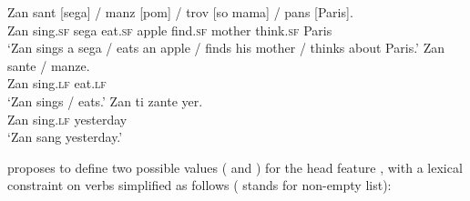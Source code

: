 \begin{exe}
\ex \begin{xlist}
\ex 
\gll Zan sant             [sega]         /  manz            [pom]           /  trov             [so mama] / pans [Paris]. \\
     Zan sing.\textsc{sf} \spacebr{}sega {} eat.\textsc{sf} \spacebr{}apple {} find.\textsc{sf} \spacebr{}\POSS{} mother {} think.\textsc{sf} \spacebr{}Paris \\
\glt `Zan sings a sega / eats an apple / finds his mother / thinks about Paris.'	
\ex 
\gll Zan sante / manze.\\
     Zan sing.\textsc{lf} {} eat.\textsc{lf}\\
\glt `Zan sings / eats.'
\ex 
\gll Zan ti zante yer. \\
Zan  \PRF{} sing.\textsc{lf} yesterday\\
\glt `Zan sang yesterday.'
\end{xlist}
\end{exe}


\citet[]{Henri2010} proposes to define two possible values ( and ) for the head
feature \vform, with a lexical constraint on verbs simplified as follows ( stands for non-empty list):

\ea
\label{sf-constraint}
 \impl 
{}
\z

